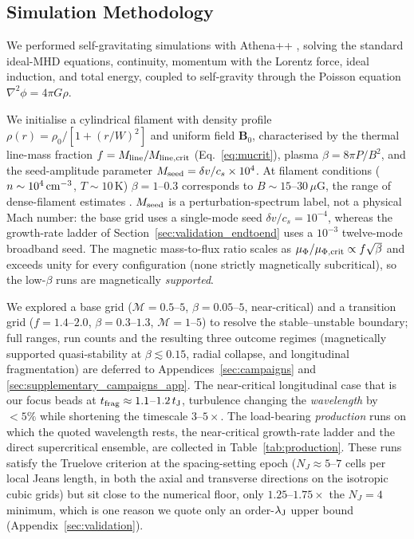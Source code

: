 \documentclass[usenatbib,twoside,twocolumn]{mnras}
\begin{document}
\subsection{Simulation Methodology}

We performed self-gravitating simulations with Athena++ \citep{Stone2020}, solving the standard ideal-MHD equations, continuity, momentum with the Lorentz force, ideal induction, and total energy, coupled to self-gravity through the Poisson equation $\nabla^2\phi=4\pi G\rho$.

We initialise a cylindrical filament with density profile $\rho(r)=\rho_0/[1+(r/W)^2]$ and uniform field $\mathbf{B}_0$, characterised by the thermal line-mass fraction $f=M_{\rm line}/M_{\rm line,crit}$ (Eq.~\ref{eq:mucrit}), plasma $\beta=8\pi P/B^2$, and the seed-amplitude parameter $M_{\rm seed}=\delta v/c_s\times10^{4}$. At filament conditions ($n\sim10^4\,{\rm cm^{-3}}$, $T\sim10$\,K) $\beta=1$--$0.3$ corresponds to $B\sim15$--$30\,\mu$G, the range of dense-filament estimates \citep{Crutcher2012}. $M_{\rm seed}$ is a perturbation-spectrum label, not a physical Mach number: the base grid uses a single-mode seed $\delta v/c_s=10^{-4}$, whereas the growth-rate ladder of Section~\ref{sec:validation_endtoend} uses a $10^{-3}$ twelve-mode broadband seed. The magnetic mass-to-flux ratio scales as $\mu_\Phi/\mu_{\Phi,\rm crit}\propto f\sqrt{\beta}$ and exceeds unity for every configuration (none strictly magnetically subcritical), so the low-$\beta$ runs are magnetically \emph{supported}.

We explored a base grid ($\mathcal{M}=0.5$--$5$, $\beta=0.05$--$5$, near-critical) and a transition grid ($f=1.4$--$2.0$, $\beta=0.3$--$1.3$, $\mathcal{M}=1$--$5$) to resolve the stable--unstable boundary; full ranges, run counts and the resulting three outcome regimes (magnetically supported quasi-stability at $\beta\lesssim0.15$, radial collapse, and longitudinal fragmentation) are deferred to Appendices~\ref{sec:campaigns} and \ref{sec:supplementary_campaigns_app}. The near-critical longitudinal case that is our focus beads at $t_{\rm frag}\approx1.1$--$1.2\,t_{\rm J}$, turbulence changing the \emph{wavelength} by $<5\%$ while shortening the timescale $3$--$5\times$. The load-bearing \emph{production} runs on which the quoted wavelength rests, the near-critical growth-rate ladder and the direct supercritical ensemble, are collected in Table~\ref{tab:production}. These runs satisfy the Truelove criterion at the spacing-setting epoch ($N_J\approx5$--$7$ cells per local Jeans length, in both the axial and transverse directions on the isotropic cubic grids) but sit close to the numerical floor, only $1.25$--$1.75\times$ the $N_J=4$ minimum, which is one reason we quote only an order-$\lambda_{\rm J}$ upper bound (Appendix~\ref{sec:validation}).
\end{document}
